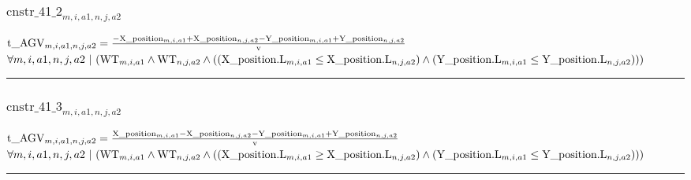 \documentclass[11pt]{article}
\begin{document}
\subsubsection*{$\text{cnstr\_41\_2}_{m, i, a1, n, j, a2}$} \label{cnstr_41_2}
$
\textcolor{black}{\text{t\_AGV}}_{m, i, a1, n, j, a2} =  \frac{-\textcolor{black}{\text{X\_position}}_{m, i, a1} + \textcolor{black}{\text{X\_position}}_{n, j, a2} - \textcolor{black}{\text{Y\_position}}_{m, i, a1} + \textcolor{black}{\text{Y\_position}}_{n, j, a2}}{\textcolor{black}{\text{v}}} 
$
\hfill
$
\forall{ m, i, a1, n, j, a2}  ~ | ~ ( \textcolor{black}{\text{WT}}_{m, i, a1} \wedge \textcolor{black}{\text{WT}}_{n, j, a2} \wedge  (  ( \textcolor{black}{\text{X\_position.L}}_{m, i, a1}  \leq  \textcolor{black}{\text{X\_position.L}}_{n, j, a2} )  \wedge  ( \textcolor{black}{\text{Y\_position.L}}_{m, i, a1}  \leq  \textcolor{black}{\text{Y\_position.L}}_{n, j, a2} )  ) )
$ \vspace{5pt}
\hrule 
\subsubsection*{$\text{cnstr\_41\_3}_{m, i, a1, n, j, a2}$} \label{cnstr_41_3}
$
\textcolor{black}{\text{t\_AGV}}_{m, i, a1, n, j, a2} =  \frac{\textcolor{black}{\text{X\_position}}_{m, i, a1} - \textcolor{black}{\text{X\_position}}_{n, j, a2} - \textcolor{black}{\text{Y\_position}}_{m, i, a1} + \textcolor{black}{\text{Y\_position}}_{n, j, a2}}{\textcolor{black}{\text{v}}} 
$
\hfill
$
\forall{ m, i, a1, n, j, a2}  ~ | ~ ( \textcolor{black}{\text{WT}}_{m, i, a1} \wedge \textcolor{black}{\text{WT}}_{n, j, a2} \wedge  (  ( \textcolor{black}{\text{X\_position.L}}_{m, i, a1}  \geq  \textcolor{black}{\text{X\_position.L}}_{n, j, a2} )  \wedge  ( \textcolor{black}{\text{Y\_position.L}}_{m, i, a1}  \leq  \textcolor{black}{\text{Y\_position.L}}_{n, j, a2} )  ) )
$ \vspace{5pt}
\hrule 
\end{document}
